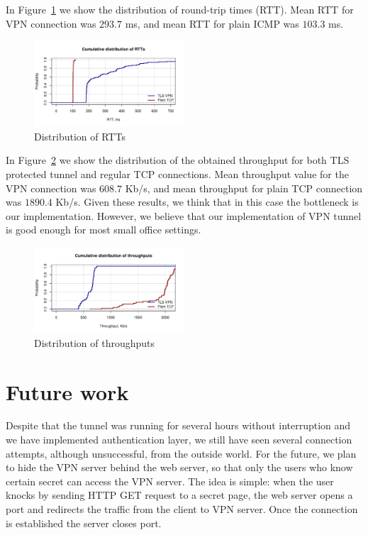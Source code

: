 In Figure~\ref{fig:rtt} we show the distribution of round-trip times
(RTT). Mean RTT for VPN connection was $293.7$ ms, and mean RTT for 
plain ICMP was $103.3$ ms.

\begin{figure}[!h]
        \includegraphics[width=0.5\textwidth]{graphics/rtt.pdf}
        \caption{Distribution of RTTs}
        \label{fig:rtt}
\end{figure}

In Figure~\ref{fig:iperf_distr} we show the distribution of the obtained throughput for both
TLS protected tunnel and regular TCP connections. Mean throughput value for the VPN connection was 
$608.7$ Kb/s, and mean throughput for plain TCP connection was $1890.4$ Kb/s. Given these results, we think that in this case the bottleneck is our implementation. However, we believe that our implementation of VPN tunnel is good enough for most small office settings.

\begin{figure}[!h]
        \includegraphics[width=0.5\textwidth]{graphics/throughput.pdf}
        \caption{Distribution of throughputs}
        \label{fig:iperf_distr}
\end{figure}


\section{Future work}

Despite that the tunnel was running for several hours without interruption and we have implemented 
authentication layer, we still have seen several connection attempts, although unsuccessful, from the outside 
world. For the future, we plan to hide the VPN server behind the web server, so that only the users 
who know certain secret can access the VPN server. The idea is simple: when the user knocks by sending
HTTP GET request to a secret page, the web server opens a port and redirects the traffic from
the client to VPN server. Once the connection is established the server closes port. 